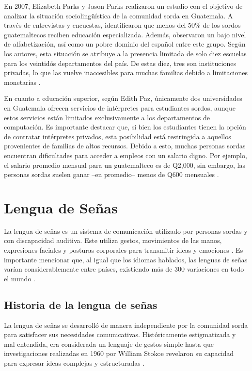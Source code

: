 En 2007, Elizabeth Parks y Jason Parks realizaron un estudio con el objetivo de analizar la situación sociolingüística de la comunidad sorda en Guatemala. A través de entrevistas y encuestas, identificaron que menos del 50\% de los sordos guatemaltecos reciben educación especializada. Además, observaron un bajo nivel de alfabetización, así como un pobre dominio del español entre este grupo. Según los autores, esta situación se atribuye a la presencia limitada de solo diez escuelas para los veintidós departamentos del país. De estas diez, tres son instituciones privadas, lo que las vuelve inaccesibles para muchas familias debido a limitaciones monetarias \cite{four}. 

En cuanto a educación superior, según Edith Paz, únicamente dos universidades en Guatemala ofrecen servicios de intérpretes para estudiantes sordos, aunque estos servicios están limitados exclusivamente a los departamentos de computación. Es importante destacar que, si bien los estudiantes tienen la opción de contratar intérpretes privados, esta posibilidad está restringida a aquellos provenientes de familias de altos recursos. Debido a esto, muchas personas sordas encuentran dificultades para acceder a empleos con un salario digno. Por ejemplo, el salario promedio mensual para un guatemalteco es de Q2,000, sin embargo, las personas sordas suelen ganar –en promedio– menos de Q600 mensuales \cite{four}.



\section{Lengua de Señas}

La lengua de señas es un sistema de comunicación utilizado por personas sordas y con discapacidad auditiva. Este utiliza gestos, movimientos de las manos, expresiones faciales y posturas corporales para transmitir ideas y emociones \cite{twelve}. Es importante mencionar que, al igual que los idiomas hablados, las lenguas de señas varían considerablemente entre países, existiendo más de 300 variaciones en todo el mundo \cite{thirteen}.


\subsection{Historia de la lengua de señas}

La lengua de señas se desarrolló de manera independiente por la comunidad sorda para satisfacer sus necesidades comunicativas. Históricamente estigmatizada y mal entendida, era considerada un lenguaje de gestos simple hasta que investigaciones realizadas en 1960 por William Stokoe revelaron su capacidad para expresar ideas complejas y estructuradas \cite{RodriguezVelasquezSF}.

